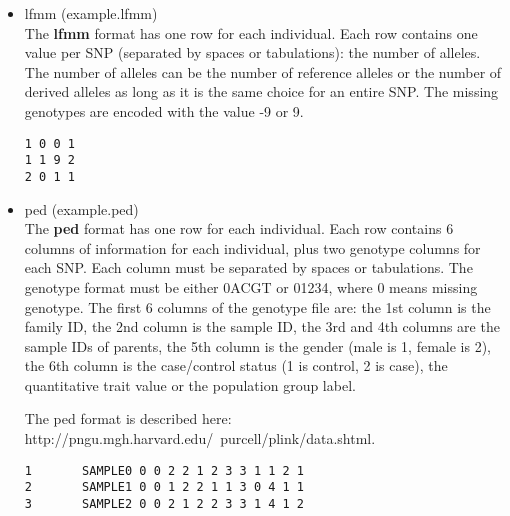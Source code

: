 \documentclass[10pt,a4paper]{article}
\begin{document}
\begin{itemize}
\item lfmm (example.lfmm)\\
The {\bf lfmm} format has one row for each individual. Each row contains
one value per SNP (separated by spaces or tabulations): the number of alleles.
The number of alleles can be the number of reference alleles or the number
of derived alleles as long as it is the same choice for an entire SNP. The missing
genotypes are encoded with the value -9 or 9.

\begin{center}
\begin{Verbatim}[frame=single]
1 0 0 1
1 1 9 2
2 0 1 1
\end{Verbatim}
\end{center}

\item ped (example.ped) \\
The {\bf ped} format has one row for each individual. Each row contains 6 columns of information for each individual, plus two genotype columns for each SNP. Each column must be separated by spaces or tabulations. The genotype format must be either 0ACGT or 01234, where 0 means missing genotype. The first 6 columns of the genotype file are: the 1st column is the family ID, the 2nd column is the sample ID, the 3rd and 4th columns are the sample IDs of parents, the 5th column is the gender (male is 1, female is 2), the 6th column is the case/control status (1 is control, 2 is case), the quantitative trait value or the population group label.

The ped format is described here: http://pngu.mgh.harvard.edu/~purcell/plink/data.shtml.

\begin{center}
\begin{Verbatim}[frame=single]
1       SAMPLE0 0 0 2 2 1 2 3 3 1 1 2 1
2       SAMPLE1 0 0 1 2 2 1 1 3 0 4 1 1
3       SAMPLE2 0 0 2 1 2 2 3 3 1 4 1 2
\end{Verbatim}
\end{center}


\end{itemize}
\end{document}
